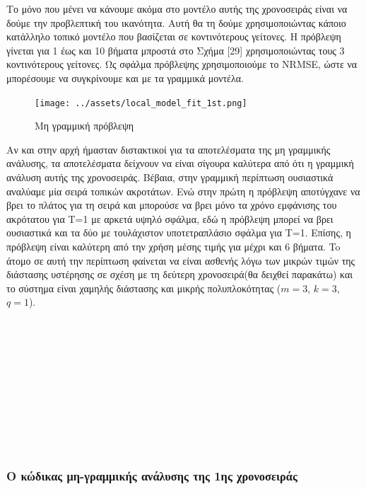 \documentclass[11pt,]{article}
\begin{document}
Το μόνο που μένει να κάνουμε ακόμα στο μοντέλο αυτής της χρονοσειράς
είναι να δούμε την προβλεπτική του ικανότητα. Αυτή θα τη δούμε
χρησιμοποιώντας κάποιο κατάλληλο τοπικό μοντέλο που βασίζεται σε
κοντινότερους γείτονες. Η πρόβλεψη γίνεται για 1 έως και 10 βήματα
μπροστά στο Σχήμα {[}29{]} χρησιμοποιώντας τους 3 κοντινότερους
γείτονες. Ως σφάλμα πρόβλεψης χρησιμοποιούμε το NRMSE, ώστε να
μπορέσουμε να συγκρίνουμε και με τα γραμμικά μοντέλα.

\begin{figure}
\centering
\texttt{[image: ../assets/local\_model\_fit\_1st.png]}
\caption{Μη γραμμική πρόβλεψη}
\end{figure}

Αν και στην αρχή ήμασταν διστακτικοί για τα αποτελέσματα της μη
γραμμικής ανάλυσης, τα αποτελέσματα δείχνουν να είναι σίγουρα καλύτερα
από ότι η γραμμική ανάλυση αυτής της χρονοσειράς. Βέβαια, στην γραμμική
περίπτωση ουσιαστικά αναλύαμε μία σειρά τοπικών ακροτάτων. Ενώ στην
πρώτη η πρόβλεψη αποτύγχανε να βρει το πλάτος για τη σειρά και μπορούσε
να βρει μόνο τα χρόνο εμφάνισης του ακρότατου για T=1 με αρκετά υψηλό
σφάλμα, εδώ η πρόβλεψη μπορεί να βρει ουσιαστικά και τα δύο με
τουλάχιστον υποτετραπλάσιο σφάλμα για T=1. Επίσης, η πρόβλεψη είναι
καλύτερη από την χρήση μέσης τιμής για μέχρι και 6 βήματα. To άτομο σε
αυτή την περίπτωση φαίνεται να είναι ασθενής λόγω των μικρών τιμών της
διάστασης υστέρησης σε σχέση με τη δεύτερη χρονοσειρά(θα δειχθεί
παρακάτω) και το σύστημα είναι χαμηλής διάστασης και μικρής
πολυπλοκότητας (\(m=3\), \(k=3\), \(q=1\)).

~

~

~

~

~

~

\hypertarget{ux3bf-ux3baux3ceux3b4ux3b9ux3baux3b1ux3c2-ux3bcux3b7-ux3b3ux3c1ux3b1ux3bcux3bcux3b9ux3baux3aeux3c2-ux3b1ux3bdux3acux3bbux3c5ux3c3ux3b7ux3c2-ux3c4ux3b7ux3c2-1ux3b7ux3c2-ux3c7ux3c1ux3bfux3bdux3bfux3c3ux3b5ux3b9ux3c1ux3acux3c2}{%
\subsubsection{Ο κώδικας μη-γραμμικής ανάλυσης της 1ης
χρονοσειράς}\label{ux3bf-ux3baux3ceux3b4ux3b9ux3baux3b1ux3c2-ux3bcux3b7-ux3b3ux3c1ux3b1ux3bcux3bcux3b9ux3baux3aeux3c2-ux3b1ux3bdux3acux3bbux3c5ux3c3ux3b7ux3c2-ux3c4ux3b7ux3c2-1ux3b7ux3c2-ux3c7ux3c1ux3bfux3bdux3bfux3c3ux3b5ux3b9ux3c1ux3acux3c2}}
\end{document}

